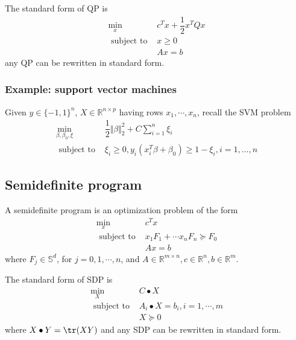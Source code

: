 \documentclass[a4paper]{article}
\begin{document}
{The standard form of QP is 
\begin{equation}
  \begin{array}{ll}
    \min\limits_{x} & c^T x + \dfrac{1}{2}x^T Qx \\
    \text { subject to } & x \geq 0 \\ \nonumber
    & Ax = b
\end{array} 
\end{equation}
any QP can be rewritten in standard form.

\subsubsection{Example: support vector machines}
Given $y \in \{-1, 1\}^n$, $X \in \mathbb{R}^{n \times p}$ having rows $x_1, \cdots, x_n$, recall the SVM problem
\begin{equation}
  \begin{array}{ll}
    \min\limits_{\beta, \beta_{0}, \xi} & \dfrac{1}{2}\Vert\beta\Vert_{2}^{2}+C \sum\limits_{i=1}^{n} \xi_{i} \\\text { subject to } & \xi_{i} \geq 0, y_{i}\left(x_{i}^{T} \beta+\beta_{0}\right) \geq 1-\xi_{i}, i=1, \ldots, n \nonumber
  \end{array}
\end{equation}

\subsection{Semidefinite program}
\begin{defi}
  A semidefinite program is an optimization problem of the form
  \[
  \begin{array}{ll}
      \min\limits_{x} & c^T x \\
      \text { subject to } & x_1 F_1 + \cdots x_n F_n \succeq F_0 \\ \nonumber
      & Ax = b
  \end{array} 
  \]
  where $F_j \in \mathbb{S}^d$, for $j = 0,1,\cdots, n$, and $A \in \mathbb{R}^{m \times n}, c \in \mathbb{R}^{n}, b \in \mathbb{R}^{m}$.
\end{defi}

The standard form of SDP is 
\begin{equation}
  \begin{array}{ll}
    \min\limits_{X} & C \bullet X \\
    \text { subject to } & A_i \bullet X = b_i, i= 1,\cdots, m \\ \nonumber
    &X \succeq 0
\end{array} 
\end{equation}
where $X \bullet Y  = \tr (XY)$ and any SDP can be rewritten in standard form.

}
\end{document}
